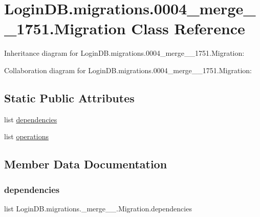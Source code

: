 \hypertarget{class_login_d_b_1_1migrations_1_10004__merge__20201206__1751_1_1_migration}{}\section{Login\+D\+B.\+migrations.0004\+\_\+merge\+\_\+\_\+1751.Migration Class Reference}
\label{class_login_d_b_1_1migrations_1_10004__merge__20201206__1751_1_1_migration}


Inheritance diagram for Login\+D\+B.\+migrations.0004\+\_\+merge\+\_\+\_\+1751.Migration\+:


Collaboration diagram for Login\+D\+B.\+migrations.0004\+\_\+merge\+\_\+\_\+1751.Migration\+:
\subsection*{Static Public Attributes}
\begin{DoxyCompactItemize}
\item 
list \hyperlink{class_login_d_b_1_1migrations_1_10004__merge__20201206__1751_1_1_migration_abc0ef4c5df7d7da80de19ee11b1b517d}{dependencies}
\item 
list \hyperlink{class_login_d_b_1_1migrations_1_10004__merge__20201206__1751_1_1_migration_a918d870d3e269a852ff0bc7de9a132de}{operations}
\end{DoxyCompactItemize}


\subsection{Member Data Documentation}
\mbox{\label{class_login_d_b_1_1migrations_1_10004__merge__20201206__1751_1_1_migration_abc0ef4c5df7d7da80de19ee11b1b517d}} 
\subsubsection{\texorpdfstring{dependencies}{dependencies}}
{\footnotesize\ttfamily list Login\+D\+B.\+migrations.\+\_\+merge\+\_\+\_.\+Migration.\+dependencies\hspace{0.3cm}{\ttfamily [static]}}


